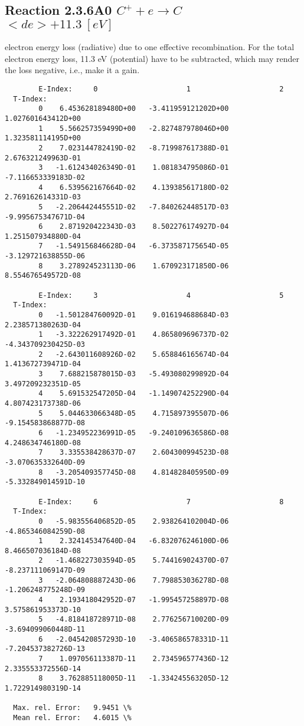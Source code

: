 \documentclass[12pt,dvipdfmx]{article}
\begin{document}
\subsection{
  Reaction 2.3.6A0 $C^+ + e \rightarrow C   $  \ $ <de>+11.3 \ [eV] $
}

  electron energy loss (radiative) due to one effective recombination.
  For the total electron energy loss, 11.3 eV (potential) have to be
  subtracted, which may render the loss negative, i.e., make it a gain.

\begin{small}\begin{verbatim}
        E-Index:     0                     1                     2
  T-Index:
        0    6.453628189480D+00   -3.411959121202D+00    1.027601643412D+00
        1    5.566257359499D+00   -2.827487978046D+00    1.323581114195D+00
        2    7.023144782419D-02   -8.719987617388D-01    2.676321249963D-01
        3   -1.612434026349D-01    1.081834795086D-01   -7.116653339183D-02
        4    6.539562167664D-02    4.139385617180D-02    2.769162614331D-03
        5   -2.206442445551D-02   -7.840262448517D-03   -9.995675347671D-04
        6    2.871920422343D-03    8.502276174927D-04    1.251507934880D-04
        7   -1.549156846628D-04   -6.373587175654D-05   -3.129721638855D-06
        8    3.278924523113D-06    1.670923171850D-06    8.554676549572D-08

        E-Index:     3                     4                     5
  T-Index:
        0   -1.501284760092D-01    9.016194688684D-03    2.238571380263D-04
        1   -3.322262917492D-01    4.865809696737D-02   -4.343709230425D-03
        2   -2.643011608926D-02    5.658846165674D-04    1.413672739471D-04
        3    7.688215878015D-03   -5.493080299892D-04    3.497209232351D-05
        4    5.691532547205D-04   -1.149074252290D-04    4.807423173738D-06
        5    5.044633066348D-05    4.715897395507D-06   -9.154583868877D-08
        6   -1.234952236991D-05   -9.240109636586D-08    4.248634746180D-08
        7    3.335538428637D-07    2.604300994523D-08   -3.070635332640D-09
        8   -3.205409357745D-08    4.814828405950D-09   -5.332849014591D-10

        E-Index:     6                     7                     8
  T-Index:
        0   -5.983556406852D-05    2.938264102004D-06   -4.865346084259D-08
        1    2.324145347640D-04   -6.832076246100D-06    8.466507036184D-08
        2   -1.468227303594D-05    5.744169024370D-07   -8.237111069147D-09
        3   -2.064808887243D-06    7.798853036278D-08   -1.206248775248D-09
        4    2.193418042952D-07   -1.995457258897D-08    3.575861953373D-10
        5   -4.818418728971D-08    2.776256710020D-09   -3.694099060448D-11
        6   -2.045420857293D-10   -3.406586578331D-11   -7.204537382726D-13
        7    1.097056113387D-11    2.734596577436D-12    2.335553372556D-14
        8    3.762885118005D-11   -1.334245563205D-12    1.722914980319D-14

  Max. rel. Error:   9.9451 \%
  Mean rel. Error:   4.6015 \%



\end{verbatim}\end{small}
\end{document}
